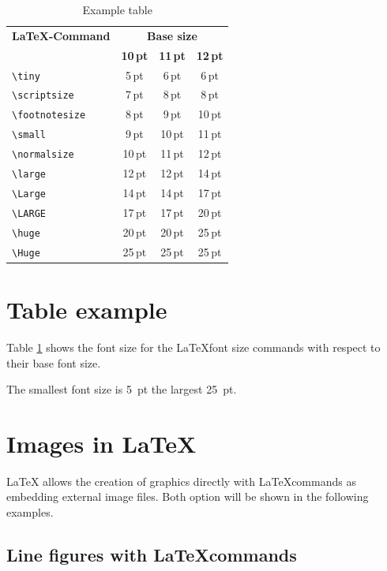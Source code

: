 \documentclass[11pt, a4paper]{article}
\newcommand{\ltx}{\LaTeX}
\begin{document}
\begin{table}[t]
\caption{Example table  \label{tab:Schriftgroessen}}
\centering
\begin{tabular}{lccc}
\toprule
\textbf{\ltx-Command} & \multicolumn{3}{c}{\textbf{Base size}}\\
\cline{2-4} & \textbf{10\,pt} & \textbf{11\,pt} & \textbf{12\,pt}\\
\midrule
\midrule
\verb+\tiny+			& 5\,pt & 6\,pt 	& 6\,pt\\
\verb+\scriptsize+		& 7\,pt & 8\,pt		& 8\,pt\\
\verb+\footnotesize+	& 8\,pt & 9\,pt		& 10\,pt\\
\verb+\small+			& 9\,pt & 10\,pt	& 11\,pt\\
\midrule
\midrule
\verb+\normalsize+		& 10\,pt	& 11\,pt	& 12\,pt\\
\midrule
\midrule
\verb+\large+			& 12\,pt	& 12\,pt	& 14\,pt\\
\verb+\Large+			& 14\,pt	& 14\,pt	& 17\,pt\\
\verb+\LARGE+			& 17\,pt	& 17\,pt	& 20\,pt\\
\verb+\huge+			& 20\,pt	& 20\,pt	& 25\,pt\\
\verb+\Huge+			& 25\,pt	& 25\,pt	& 25\,pt\\
\bottomrule
\end{tabular}
\end{table}%

\section{Table example}
Table \ref{tab:Schriftgroessen} shows the font size for the \ltx font size commands with respect to their base font size.

The smallest font size is 5~pt the largest 25~pt.

\section{Images in \ltx}
\ltx{} allows the creation of graphics directly with \ltx commands as embedding external image files. Both option will be shown in the following examples.

\subsection{Line figures with \ltx commands}
\end{document}
